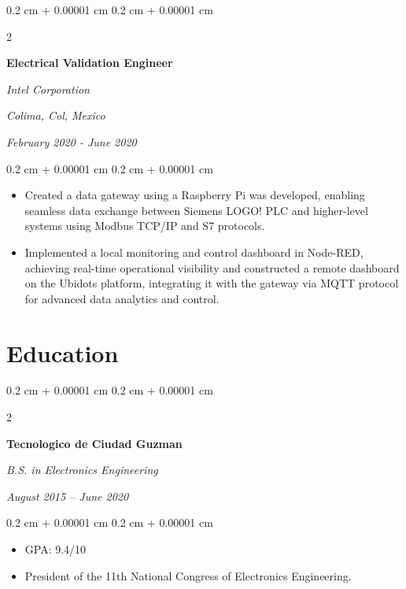 \documentclass[10pt, letterpaper]{article}
\newenvironment{highlights}{
    \begin{itemize}[
        topsep=0.10 cm,
        parsep=0.10 cm,
        partopsep=0pt,
        itemsep=0pt,
        leftmargin=0.4 cm + 10pt
    ]
}{
    \end{itemize}
} %
\newenvironment{onecolentry}{
    \begin{adjustwidth}{
        0.2 cm + 0.00001 cm
    }{
        0.2 cm + 0.00001 cm
    }
}{
    \end{adjustwidth}
} %
\newenvironment{twocolentry}[2][]{
    \onecolentry
    \def\secondColumn{#2}
    \setcolumnwidth{\fill, 4.5 cm}
    \begin{paracol}{2}
}{
    \switchcolumn \raggedleft \secondColumn
    \end{paracol}
    \endonecolentry
} %
\begin{document}
        \vspace{0.2 cm}

        \begin{twocolentry}{
        \textit{Colima, Col, Mexico}    
            
        \textit{February 2020 - June 2020}}
            \textbf{Electrical Validation Engineer}
            
            \textit{Intel Corporation}
        \end{twocolentry}

        \vspace{0.10 cm}
        \begin{onecolentry}
            \begin{highlights}
                \item Created a data gateway using a Raspberry Pi was developed, enabling seamless data exchange between Siemens LOGO! PLC and higher-level systems using Modbus TCP/IP and S7 protocols.
                \item Implemented a local monitoring and control dashboard in Node-RED, achieving real-time operational visibility and constructed a remote dashboard on the Ubidots platform, integrating it with the gateway via MQTT protocol for advanced data analytics and control.
            \end{highlights}
        \end{onecolentry}

    
    \section{Education}



        
        \begin{twocolentry}{
            
            
        \textit{August 2015 – June 2020}}
            \textbf{Tecnologico de Ciudad Guzman}

            \textit{B.S. in Electronics Engineering}
        \end{twocolentry}

        \vspace{0.10 cm}
        \begin{onecolentry}
            \begin{highlights}
                \item GPA: 9.4/10 
                \item President of the 11th National Congress of Electronics Engineering.
            \end{highlights}
        \end{onecolentry}
\end{document}
